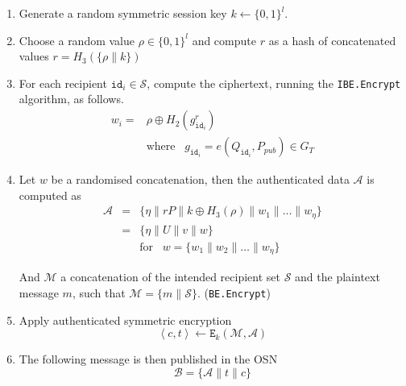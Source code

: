 \documentclass[journal]{IEEEtran}
\newcommand{\id}[1]{\ensuremath{\mathtt{id}_{#1}}}
\begin{document}
\begin{description}
    \begin{enumerate}
        \item Generate a random symmetric session key $k \leftarrow \{ 0,1 \}^{l}$.
        \item Choose a random value $\rho \in \{ 0,1 \}^{l}$ and compute $r$ as a hash of concatenated values $r = H_3 \left( \{ \rho \parallel k \} \right)$
        \item For each recipient $\id{i} \in \mathcal{S}$, compute the ciphertext, running the \texttt{IBE.Encrypt} algorithm, as follows.
            \begin{equation*}
            \begin{array}{ll}
                w_i = & \rho \oplus H_2 \left( g_{\id{i}}^r \right)  \\ & \textrm{where} \; \; \; g_{\id{i}} = e \left( Q_{\id{i}}, P_{pub} \right) \in G_T
            \end{array}
            \end{equation*}
        \item Let $w$ be a randomised concatenation, then the authenticated data $\mathcal{A}$ is computed as                                  
        \begin{equation*}
                \begin{array}{lcl}
                    \mathcal{A} & = & \{ \eta \parallel rP \parallel k \oplus H_3 \left( \rho \right) \parallel w_1  \parallel \ldots \parallel w_\eta \} \\
                    & = & \{ \eta \parallel U \parallel v \parallel w \} \\
                    & & \textrm{for}\; \; \; w = \{ w_1 \parallel w_2 \parallel \ldots \parallel w_\eta \}
                \end{array} 
            \end{equation*}
            
        And $\mathcal{M}$ a concatenation of the intended recipient set $\mathcal{S}$ and the plaintext message $m$, such that $\mathcal{M} = \{ m \parallel \mathcal{S} \}$. (\texttt{BE.Encrypt})
    
        \item Apply authenticated symmetric encryption
        \begin{equation*}
            \left< c, t \right> \leftarrow \mathtt{E}_k(\mathcal{M},\mathcal{A})
        \end{equation*}
        \item The following message is then published in the OSN
        \begin{equation*}
            \mathcal{B} = \{ \mathcal{A} \parallel t \parallel c \}
        \end{equation*}
    \end{enumerate}
    

\end{description}
\end{document}
